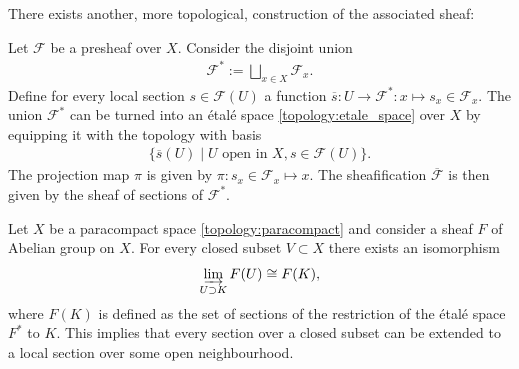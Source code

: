     There exists another, more topological, construction of the associated sheaf:
    \begin{construct}\label{sheaf:etale_construction}
        Let $\mathcal{F}$ be a presheaf over $X$. Consider the disjoint union
        \begin{gather}
            \mathcal{F}^* := \bigsqcup_{x\in X}\mathcal{F}_x.
        \end{gather}
        Define for every local section $s\in\mathcal{F}(U)$ a function $\overline{s}:U\rightarrow\mathcal{F}^*:x\mapsto s_x\in\mathcal{F}_x$. The union $\mathcal{F}^*$ can be turned into an \'etal\'e space \ref{topology:etale_space} over $X$ by equipping it with the topology with basis
        \begin{gather}
            \big\{\overline{s}(U)\mid U\text{ open in }X, s\in\mathcal{F}(U)\big\}.
        \end{gather}
        The projection map $\pi$ is given by $\pi:s_x\in\mathcal{F}_x\mapsto x$. The sheafification $\overline{\mathcal{F}}$ is then given by the sheaf of sections of $\mathcal{F}^*$.
    \end{construct}

    \begin{property}
        Let $X$ be a paracompact space \ref{topology:paracompact} and consider a sheaf $F$ of Abelian group on $X$. For every closed subset $V\subset X$ there exists an isomorphism
        \begin{gather}
            \varinjlim_{U\supset K}F(U)\cong F(K),
        \end{gather}
        where $F(K)$ is defined as the set of sections of the restriction of the \'etal\'e space $F^*$ to $K$. This implies that every section over a closed subset can be extended to a local section over some open neighbourhood.
    \end{property}


